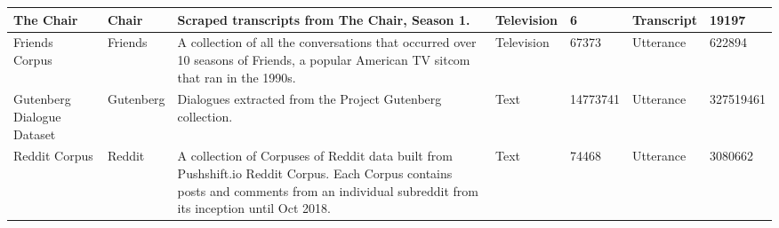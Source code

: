\documentclass[10pt]{article}
\begin{document}
\begin{table}
\begin{tabular}{p{0.6in}|l|p{2in}|l|p{0.5in}|p{0.5in}|p{0.5in}}
        \midrule
        The Chair & Chair & Scraped transcripts from The Chair, Season 1. & Television & 6 & Transcript & 19197 \\
        \midrule
        Friends Corpus & Friends & A collection of all the conversations that occurred over 10 seasons of Friends, a popular American TV sitcom that ran in the 1990s. & Television & 67373 & Utterance & 622894 \\
        \midrule
        Gutenberg Dialogue Dataset & Gutenberg & Dialogues extracted from the Project Gutenberg collection. & Text & 14773741 & Utterance & 327519461 \\
        \midrule
        Reddit Corpus & Reddit & A collection of Corpuses of Reddit data built from Pushshift.io Reddit Corpus. Each Corpus contains posts and comments from an individual subreddit from its inception until Oct 2018. & Text & 74468 & Utterance & 3080662 \\
        \bottomrule
    \end{tabular}
\end{table}
\end{document}
